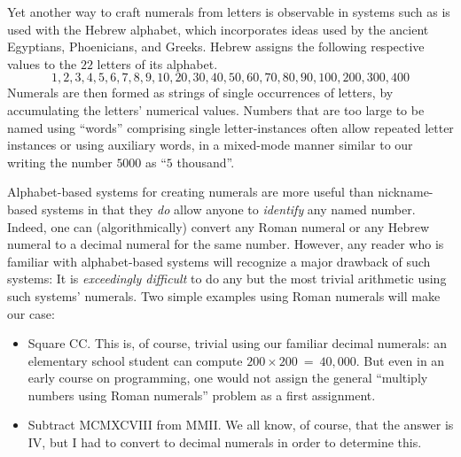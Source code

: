 Yet another way to craft numerals from letters is observable in
systems such as is used with the Hebrew alphabet, which incorporates
ideas used by the ancient Egyptians, Phoenicians, and Greeks.  Hebrew
assigns the following respective values to the $22$ letters of its
alphabet.
\[ 1, 2, 3, 4, 5, 6, 7, 8, 9, 10,
20, 30, 40, 50, 60, 70, 80, 90, 100,
 200, 300, 400
\]
Numerals are then formed as strings of single occurrences of letters,
by accumulating the letters' numerical values.  Numbers that are too
large to be named using ``words'' comprising single letter-instances
often allow repeated letter instances or using auxiliary words, in a
mixed-mode manner similar to our writing the number $5000$ as ``$5$
thousand''.


Alphabet-based systems for creating numerals are more useful than
nickname-based systems in that they {\em do} allow anyone to {\em
  identify} any named number.  Indeed, one can (algorithmically)
convert any Roman numeral or any Hebrew numeral to a decimal numeral
for the same number.  However, any reader who is familiar with
alphabet-based systems will recognize a major drawback of such
systems: It is {\em exceedingly difficult} to do any but the most
trivial arithmetic using such systems' numerals.  Two simple examples
using Roman numerals will make our case:
\begin{itemize}
\item
Square CC.  This is, of course, trivial using our familiar decimal
numerals: an elementary school student can compute $200 \times 200 \ =
\ 40,000$.  But even in an early course on programming, one would not
assign the general ``multiply numbers using Roman numerals'' problem
as a first assignment.

\item
Subtract MCMXCVIII from MMII.  We all know, of course, that the answer
is IV, but I had to convert to decimal numerals in order to determine
this.
\end{itemize}


